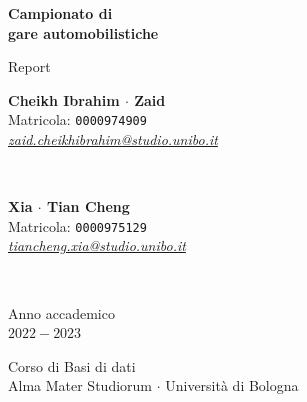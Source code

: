 \documentclass[11pt]{article}
\begin{document}
\begin{titlepage}
    \begin{center}
        \vspace*{1.5cm}
            
        \Huge
        \textbf{Campionato di\\gare automobilistiche}
            
        \vspace{0.3cm}
        \LARGE
        Report\\[0.2em]

        \vspace{1.5cm}
          
        \begin{minipage}[t]{0.47\textwidth}
            \begin{center}
                \parbox{65mm}{\centering\large {\bf Cheikh Ibrahim $\cdot$ Zaid} \\[0.3em] Matricola: \texttt{0000974909} \\[0.3em] \href{mailto:zaid.cheikhibrahim@studio.unibo.it}{\textit{zaid.cheikhibrahim@studio.unibo.it}}} \\[2em]
            \end{center}
		\end{minipage}
		\hfill
		\begin{minipage}[t]{0.47\textwidth}\raggedleft
            \begin{center}
                \parbox{65mm}{\centering\large {\bf Xia $\cdot$ Tian Cheng} \\[0.3em] Matricola: \texttt{0000975129} \\[0.3em] \href{mailto:tiancheng.xia@studio.unibo.it}{\textit{tiancheng.xia@studio.unibo.it}}} \\[2em]
            \end{center}
		\end{minipage}  
            
        \vspace{9cm}
            
        Anno accademico\\
        $2022 - 2023$
            
        \vspace{0.8cm}
            
            
        \Large
        Corso di Basi di dati\\
        Alma Mater Studiorum $\cdot$ Università di Bologna\\
            
    \end{center}
\end{titlepage}
\pagebreak
\end{document}
